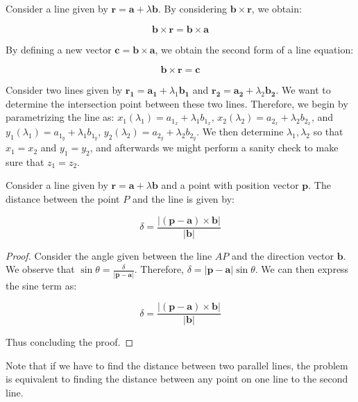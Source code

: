 \documentclass[12pt]{article}
\begin{document}
\begin{proposition}
    Consider a line given by $\mathbf{r} = \mathbf{a} + \lambda\mathbf{b}$. By considering $\mathbf{b \times r}$, we obtain:

    \[ \mathbf{b \times r} = \mathbf{b \times a} \]

    By defining a new vector $\mathbf{c} = \mathbf{b \times a}$, we obtain the second form of a line equation:

    \[ \mathbf{b \times r} = \mathbf{c} \]
\end{proposition}

\begin{proposition}
    Consider two lines given by $\mathbf{r_1} = \mathbf{a_1} + \lambda_1\mathbf{b_1}$ and $\mathbf{r_2} = \mathbf{a_2} + \lambda_2\mathbf{b_2}$. We want to determine the intersection point between these two lines. Therefore, we begin by parametrizing the line as: $x_1(\lambda_1) = a_{1_x} + \lambda_1b_{1_x}$, $x_2(\lambda_2) = a_{2_x} + \lambda_2b_{2_x}$, and $y_1(\lambda_1) = a_{1_y} + \lambda_1b_{1_y}$, $y_2(\lambda_2) = a_{2_y} + \lambda_2b_{2_y}$. We then determine $\lambda_1, \lambda_2$ so that $x_1 = x_2$ and $y_1 = y_2$, and afterwards we might perform a sanity check to make sure that $z_1 = z_2$.
\end{proposition}

\begin{proposition}
    Consider a line given by $\mathbf{r} = \mathbf{a} + \lambda\mathbf{b}$ and a point with position vector $\mathbf{p}$. The distance between the point $P$ and the line is given by:

    \[ \delta = \frac{|(\mathbf{p - a}) \times \mathbf{b}|}{|\mathbf{b}|} \]
\end{proposition}

\begin{proof}
        Consider the angle given between the line $AP$ and the direction vector $\mathbf{b}$. We observe that $\sin{\theta} = \frac{\delta}{\mathbf{|p - a|}}$. Therefore, $\delta = |\mathbf{p - a}|\sin{\theta}$. We can then express the sine term as:

        \[ \delta = \frac{|(\mathbf{p - a}) \times \mathbf{b}|}{|\mathbf{b}|} \]

        Thus concluding the proof.
    \end{proof}

Note that if we have to find the distance between two parallel lines, the problem is equivalent to finding the distance between any point on one line to the second line.
\end{document}
